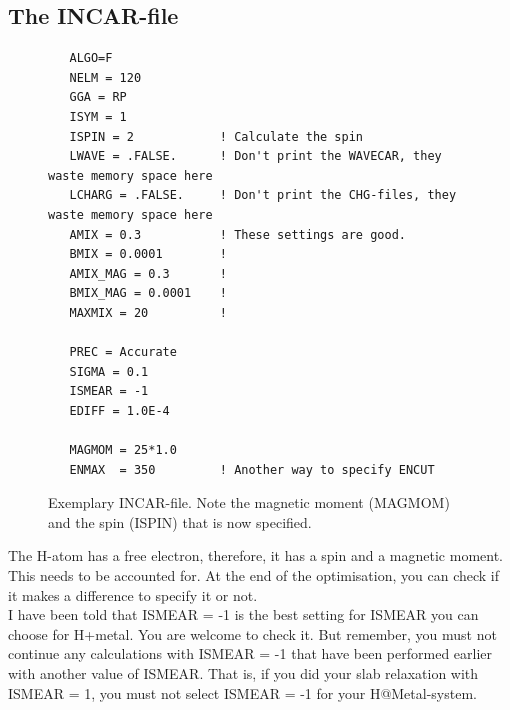 \documentclass[twoside, 11pt, titlepage, captions=nooneline, a4paper, headsepline]{scrbook}%
\begin{document}
\subsection{The INCAR-file}
\begin{figure}[h!!]
\begin{verbatim}
   ALGO=F
   NELM = 120
   GGA = RP
   ISYM = 1
   ISPIN = 2			! Calculate the spin
   LWAVE = .FALSE.		! Don't print the WAVECAR, they waste memory space here
   LCHARG = .FALSE.		! Don't print the CHG-files, they waste memory space here
   AMIX = 0.3			! These settings are good.
   BMIX = 0.0001		!
   AMIX_MAG = 0.3		!
   BMIX_MAG = 0.0001	!
   MAXMIX = 20			!

   PREC = Accurate
   SIGMA = 0.1
   ISMEAR = -1
   EDIFF = 1.0E-4

   MAGMOM = 25*1.0
   ENMAX  = 350			! Another way to specify ENCUT
\end{verbatim}
\caption{Exemplary INCAR-file. Note the magnetic moment (MAGMOM) and the spin (ISPIN) that is now specified.}
\label{cin}
\end{figure}
The H-atom has a free electron, therefore, it has a spin and a magnetic moment. This needs to be accounted for. At the end of the optimisation, you can check if it makes a difference to specify it or not.\\
I have been told that ISMEAR = -1 is the best setting for ISMEAR you can choose for H+metal. You are welcome to check it. But remember, you must not continue any calculations with ISMEAR = -1 that have been performed earlier with another value of ISMEAR. That is, if you did your slab relaxation with ISMEAR = 1, you must not select ISMEAR = -1 for your H@Metal-system.\\
\end{document}

